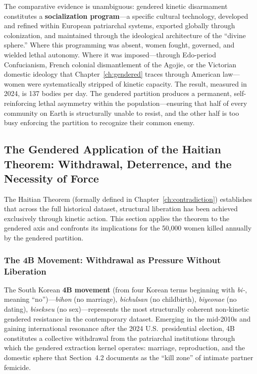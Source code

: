 The comparative evidence is unambiguous: gendered kinetic disarmament constitutes a \textbf{socialization program}---a specific cultural technology, developed and refined within European patriarchal systems, exported globally through colonization, and maintained through the ideological architecture of the ``divine sphere.'' Where this programming was absent, women fought, governed, and wielded lethal autonomy. Where it was imposed---through Edo-period Confucianism, French colonial dismantlement of the Agojie, or the Victorian domestic ideology that Chapter~\ref{ch:gendered} traces through American law---women were systematically stripped of kinetic capacity. The result, measured in 2024, is 137 bodies per day. The gendered partition produces a permanent, self-reinforcing lethal asymmetry within the population---ensuring that half of every community on Earth is structurally unable to resist, and the other half is too busy enforcing the partition to recognize their common enemy.

\subsection{The Gendered Application of the Haitian Theorem: Withdrawal, Deterrence, and the Necessity of Force}

The Haitian Theorem (formally defined in Chapter~\ref{ch:contradiction}) establishes that across the full historical dataset, structural liberation has been achieved exclusively through kinetic action. This section applies the theorem to the gendered axis and confronts its implications for the 50,000 women killed annually by the gendered partition.

\subsubsection{The 4B Movement: Withdrawal as Pressure Without Liberation}

The South Korean \textbf{4B movement} (from four Korean terms beginning with \textit{bi-}, meaning ``no'')---\textit{bihon} (no marriage), \textit{bichulsan} (no childbirth), \textit{biyeonae} (no dating), \textit{bisekseu} (no sex)---represents the most structurally coherent non-kinetic gendered resistance in the contemporary dataset. Emerging in the mid-2010s and gaining international resonance after the 2024 U.S.\ presidential election, 4B constitutes a collective withdrawal from the patriarchal institutions through which the gendered extraction kernel operates: marriage, reproduction, and the domestic sphere that Section~4.2 documents as the ``kill zone'' of intimate partner femicide.

